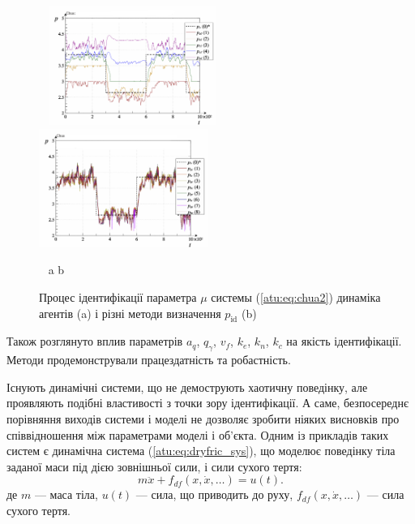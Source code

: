 \documentclass[a4paper,13pt]{atuaref}
\begin{document}
\begin{figure}[htb!]
\centerline{
    ~ \hfill
    \includegraphics[width=0.49\textwidth]{p5/p/cha/chua/ql3rlWvnAAW/chua_id-p_t_pi_ql3rlWvnAAW_sign_xl.png}
    \hfill
    \includegraphics[width=0.49\textwidth]{p5/p/cha/chua/ql3rlWvnAAW/chua_id-p_t_p_ql3rlWvnAAW_sign_xl.png}
    \hfill ~
}
  \vspace{-1.5ex}
  \begin{center}
    ~ \hfill a \hfill\hfill b \hfill ~
  \end{center}
  \vspace{-2.5ex}
\caption{Процес ідентифікації параметра $\mu$ системы (\ref{atu:eq:chua2})
  динаміка агентів (a) і різні методи визначення $p_\mathrm{id}$ (b)
}
\label{atu:f:chua_id}
\end{figure}

Також розглянуто вплив параметрів $a_q$, $q_\gamma$, $v_f$, $k_e$, $k_n$, $k_c$
на якість ідентифікації. Методи
продемонстрували працездатність та робастність.


Існують динамічні системи, що не демострують хаотичну поведінку,
але проявляють подібні властивості з точки зору ідентифікації. А саме,
безпосереднє порівняння виходів системи і моделі не дозволяє зробити ніяких
висновків про співвідношення між параметрами моделі і об'єкта. Одним із
прикладів таких систем є динамічна система (\ref{atu:eq:dryfric_sys}), що
моделює поведінку тіла заданої маси під дією зовнішньої сили, і сили
сухого тертя: %
%
\begin{equation}
  m \ddot{x} + f_{df}( x, \dot{x}, \ldots)  = u(t).
\label{atu:eq:dryfric_sys}
\end{equation}
%
де
$m$ --- маса тіла,
$u(t)$ --- сила, що приводить до руху,
$f_{df}( x, \dot{x}, \ldots)$ --- сила сухого тертя.
\end{document}
